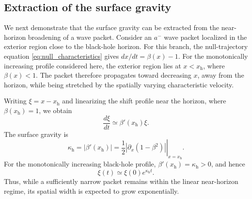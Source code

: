 \documentclass[reprint,amsmath,amssymb,aps,prb,showkeys,superscriptaddress]{revtex4-2}
\begin{document}
\subsection{Extraction of the surface gravity}
\label{subsec:surface_gravity}

We next demonstrate that the surface gravity can be extracted from
the near-horizon broadening of a wave packet. Consider an $a^-$
wave packet localized in the exterior region close to the
black-hole horizon. For this branch, the null-trajectory equation
\eqref{eq:null_characteristics} gives
$dx/dt=\beta(x)-1$. For the monotonically increasing profile
considered here, the exterior region lies at $x<x_{\mathrm h}$,
where $\beta(x)<1$. The packet therefore propagates toward
decreasing $x$, away from the horizon, while being stretched by the
spatially varying characteristic velocity.

Writing $\xi=x-x_{\mathrm h}$ and linearizing the shift profile
near the horizon, where $\beta(x_{\mathrm h})=1$, we obtain
\begin{equation}
  \frac{d\xi}{dt}
  \simeq
  \beta'(x_{\mathrm h})\xi.
  \label{eq:near_horizon_linearization}
\end{equation}
The surface gravity is
\begin{equation}
  \kappa_{\mathrm h}
  =
  \left|
    \beta'(x_{\mathrm h})
  \right|
  =
  \left.
  \frac{1}{2}
  \left|
    \partial_x\left(1-\beta^2\right)
  \right|
  \right|_{x=x_{\mathrm h}}.
  \label{eq:surface_gravity}
\end{equation}
For the monotonically increasing black-hole profile,
$\beta'(x_{\mathrm h})=\kappa_{\mathrm h}>0$, and hence
\begin{equation}
  \xi(t)
  \simeq
  \xi(0)e^{\kappa_{\mathrm h}t}.
  \label{eq:near_horizon_separation}
\end{equation}
Thus, while a sufficiently narrow packet remains within the
linear near-horizon regime, its spatial width is expected to grow
exponentially.
\end{document}
